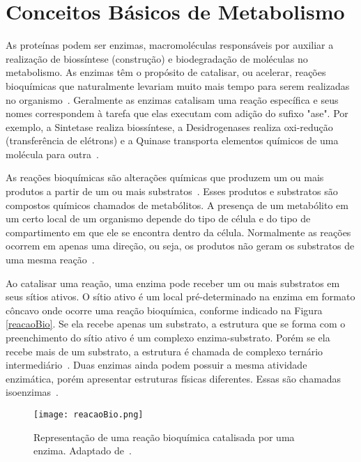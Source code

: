

\section{Conceitos Básicos de Metabolismo} \label{conceitosMeta}


\indent As proteínas podem ser enzimas, macromoléculas responsáveis por auxiliar a realização de biossíntese (construção) e biodegradação de moléculas no metabolismo. As enzimas têm o propósito de catalisar, ou acelerar, reações bioquímicas que naturalmente levariam muito mais tempo para serem realizadas no organismo~\cite{setubal97}. Geralmente as enzimas catalisam uma reação específica e seus nomes correspondem à tarefa que elas executam com adição do sufixo "ase". Por exemplo, a Sintetase realiza biossíntese, a Desidrogenases realiza oxi-redução (transferência de elétrons) e a Quinase transporta elementos químicos de uma molécula para outra~\cite{enzymesKirk}.

\indent As reações bioquímicas são alterações químicas que produzem um ou mais produtos a partir de um ou mais substratos~\cite{lacroixCTS08}. Esses produtos e substratos são compostos químicos chamados de metabólitos. A presença de um metabólito em um certo local de um organismo depende do tipo de célula e do tipo de compartimento em que ele se encontra dentro da célula. Normalmente as reações ocorrem em apenas uma direção, ou seja, os produtos não geram os substratos de uma mesma reação~\cite{lacroixCTS08}.

\indent Ao catalisar uma reação, uma enzima pode receber um ou mais substratos em seus sítios ativos. O sítio ativo é um local pré-determinado na enzima em formato côncavo onde ocorre uma reação bioquímica, conforme indicado na Figura \ref{reacaoBio}. Se ela recebe apenas um substrato, a estrutura que se forma com o preenchimento do sítio ativo é um complexo enzima-substrato. Porém se ela recebe mais de um substrato, a estrutura é chamada de complexo ternário intermediário~\cite{Cap2schomburg}. Duas enzimas ainda podem possuir a mesma atividade enzimática, porém apresentar estruturas físicas diferentes. Essas são chamadas isoenzimas~\cite{Cap2schomburg}.

\begin{figure}[h]
    \centering
    \texttt{[image: reacaoBio.png]}
    \caption{Representação de uma reação bioquímica catalisada por uma enzima. Adaptado de~\cite{reacaoBioUSP}.}
    \label{fig:bioLuz}
\end{figure}

